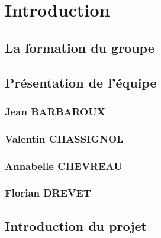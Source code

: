 \section{Introduction}
\subsection{La formation du groupe}
\subsection{Présentation de l'équipe}
\subsubsection{Jean BARBAROUX}
\subsubsection{Valentin CHASSIGNOL}
\subsubsection{Annabelle CHEVREAU}
\subsubsection{Florian DREVET}
\subsection{Introduction du projet}
